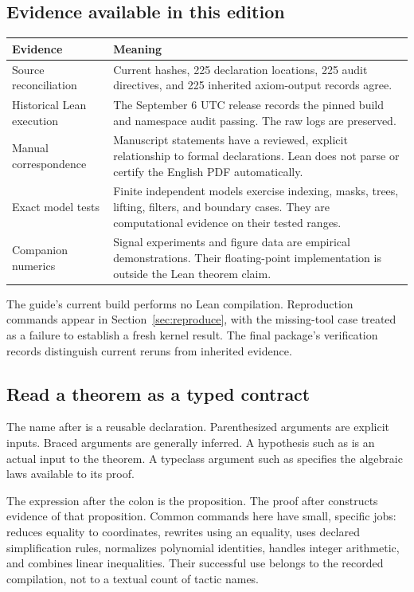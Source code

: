 \subsection{Evidence available in this edition}
\begin{longtable}{>{\raggedright\arraybackslash}p{}>{\raggedright\arraybackslash}p{}}
\toprule Evidence & Meaning \\ \midrule\endhead
Source reconciliation & Current hashes, 225 declaration locations, 225 audit directives, and 225 inherited axiom-output records agree. \\ \addlinespace
Historical Lean execution & The September 6 UTC release records the pinned build and namespace audit passing. The raw logs are preserved. \\ \addlinespace
Manual correspondence & Manuscript statements have a reviewed, explicit relationship to formal declarations. Lean does not parse or certify the English PDF automatically. \\ \addlinespace
Exact model tests & Finite independent models exercise indexing, masks, trees, lifting, filters, and boundary cases. They are computational evidence on their tested ranges. \\ \addlinespace
Companion numerics & Signal experiments and figure data are empirical demonstrations. Their floating-point implementation is outside the Lean theorem claim. \\ \bottomrule
\end{longtable}
The guide's current build performs no Lean compilation. Reproduction commands appear in Section~\ref{sec:reproduce}, with the missing-tool case treated as a failure to establish a fresh kernel result. The final package's verification records distinguish current reruns from inherited evidence.

\subsection{Read a theorem as a typed contract}
The name after  is a reusable declaration. Parenthesized arguments are explicit inputs. Braced arguments are generally inferred. A hypothesis such as  is an actual input to the theorem. A typeclass argument such as \code{[AddCommMonoid E]} specifies the algebraic laws available to its proof.

The expression after the colon is the proposition. The proof after  constructs evidence of that proposition. Common commands here have small, specific jobs:  reduces equality to coordinates,  rewrites using an equality,  uses declared simplification rules,  normalizes polynomial identities,  handles integer arithmetic, and  combines linear inequalities. Their successful use belongs to the recorded compilation, not to a textual count of tactic names.

